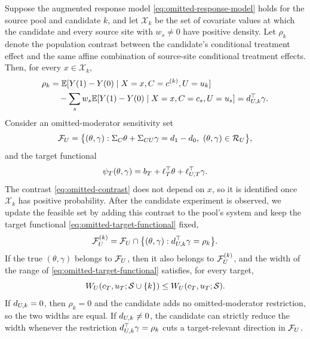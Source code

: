 \begin{theorem}
\label{thm:omitted-refinement}
Suppose the augmented response model \eqref{eq:omitted-response-model} holds
for the source pool and candidate $k$, and let $\mathcal X_k$ be the set
of covariate values at which the candidate and every source site with
$w_s\neq0$ have positive density. Let $\rho_k$ denote the population
contrast between the candidate's conditional treatment effect and the same
affine combination of source-site conditional treatment effects. Then, for
every $x\in\mathcal X_k$,
\begin{equation}
\begin{split}
\rho_k
&=\mathbb{E}[Y(1)-Y(0)\mid X=x,C=c^{(k)},U=u_k]\\
&\quad-\sum_s w_s\mathbb{E}[Y(1)-Y(0)\mid X=x,C=c_s,U=u_s]
=d_{U,k}^\top\gamma.
\end{split}
\label{eq:omitted-contrast}
\end{equation}
Consider an omitted-moderator sensitivity set
\begin{equation}
  \mathcal F_U
  =\bigl\{(\theta,\gamma):\Sigma_C\theta+\Sigma_{CU}\gamma
  =d_{1}-d_{0},\ (\theta,\gamma)\in\mathcal R_U\bigr\},
  \label{eq:omitted-feasible-set}
\end{equation}
and the target functional
\begin{equation}
  \psi_T(\theta,\gamma)
  =b_T+\ell_T^\top\theta+\ell_{U,T}^\top\gamma.
  \label{eq:omitted-target-functional}
\end{equation}
The contrast \eqref{eq:omitted-contrast} does not depend on $x$, so it is
identified once $\mathcal X_k$ has positive probability. After the
candidate experiment is observed, we update the feasible set by adding
this contrast to the pool's system and keep the target functional
\eqref{eq:omitted-target-functional} fixed,
\begin{equation}
  \mathcal F_U^{(k)}
  =\mathcal F_U\cap\bigl\{(\theta,\gamma):d_{U,k}^\top\gamma=\rho_k\bigr\}.
  \label{eq:omitted-feasible-update}
\end{equation}
If the true $(\theta,\gamma)$ belongs to $\mathcal F_U$, then it also belongs
to $\mathcal F_U^{(k)}$, and the width of the range of
\eqref{eq:omitted-target-functional} satisfies, for every target,
\begin{equation}
  W_U(c_T,u_T;\mathcal S\cup\{k\})
  \leq W_U(c_T,u_T;\mathcal S).
  \label{eq:omitted-monotonicity}
\end{equation}
If $d_{U,k}=0$, then $\rho_k=0$ and the candidate adds no omitted-moderator
restriction, so the two widths are equal. If $d_{U,k}\neq0$, the candidate
can strictly reduce the width whenever the restriction
$d_{U,k}^\top\gamma=\rho_k$ cuts a target-relevant direction in $\mathcal F_U$.
\end{theorem}

